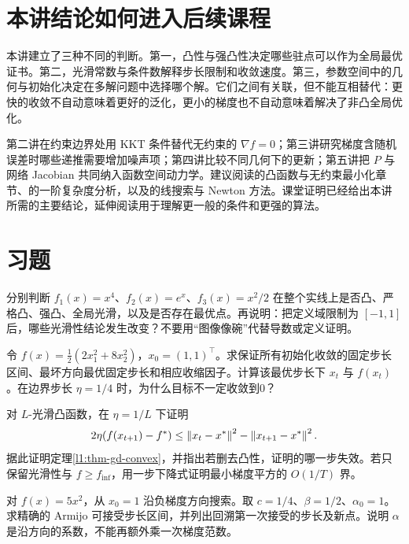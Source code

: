 \section{本讲结论如何进入后续课程}
\label{l1:bridge}

本讲建立了三种不同的判断。第一，凸性与强凸性决定哪些驻点可以作为全局最优证书。第二，光滑常数与条件数解释步长限制和收敛速度。第三，参数空间中的几何与初始化决定在多解问题中选择哪个解。它们之间有关联，但不能互相替代：更快的收敛不自动意味着更好的泛化，更小的梯度也不自动意味着解决了非凸全局优化。

第二讲在约束边界处用 KKT 条件替代无约束的 $\nabla f=0$；第三讲研究梯度含随机误差时哪些递推需要增加噪声项；第四讲比较不同几何下的更新；第五讲把 $P$ 与网络 Jacobian 共同纳入函数空间动力学。建议阅读\citet{Boyd2004}的凸函数与无约束最小化章节、\citet{Nesterov2004}的一阶复杂度分析，以及\citet{Nocedal2006}的线搜索与 Newton 方法。课堂证明已经给出本讲所需的主要结论，延伸阅读用于理解更一般的条件和更强的算法。

\section{习题}
\label{l1:exercises}

\begin{exercise}[基本性质与结论边界]
\label{l1:exercise-properties}
分别判断 $f_1(x)=x^4$、$f_2(x)=e^x$、$f_3(x)=x^2/2$ 在整个实线上是否凸、严格凸、强凸、全局光滑，以及是否存在最优点。再说明：把定义域限制为 $[-1,1]$ 后，哪些光滑性结论发生改变？不要用“图像像碗”代替导数或定义证明。
\end{exercise}

\begin{exercise}[梯度下降的谱与稳定性]
\label{l1:exercise-spectrum}
令 $f(x)=\tfrac12(2x_1^2+8x_2^2)$，$x_0=(1,1)^\top$。求保证所有初始化收敛的固定步长区间、最坏方向最优固定步长和相应收缩因子。计算该最优步长下 $x_t$ 与 $f(x_t)$。在边界步长 $\eta=1/4$ 时，为什么目标不一定收敛到0？
\end{exercise}

\begin{exercise}[重新组织收敛证明]
\label{l1:exercise-proof}
对 $L$-光滑凸函数，在 $\eta=1/L$ 下证明
\[
 2\eta(f(x_{t+1})-f^*)\leq
 \left\lVert x_t-x^*\right\rVert^2-\left\lVert x_{t+1}-x^*\right\rVert^2.
\]
据此证明定理\ref{l1:thm-gd-convex}，并指出若删去凸性，证明的哪一步失效。若只保留光滑性与 $f\geq f_{\inf}$，用一步下降式证明最小梯度平方的 $O(1/T)$ 界。
\end{exercise}

\begin{exercise}[回溯线搜索的手算]
\label{l1:exercise-armijo}
对 $f(x)=5x^2$，从 $x_0=1$ 沿负梯度方向搜索。取 $c=1/4$、$\beta=1/2$、$\alpha_0=1$。求精确的 Armijo 可接受步长区间，并列出回溯第一次接受的步长及新点。说明 $\alpha$ 是沿方向的系数，不能再额外乘一次梯度范数。
\end{exercise}

